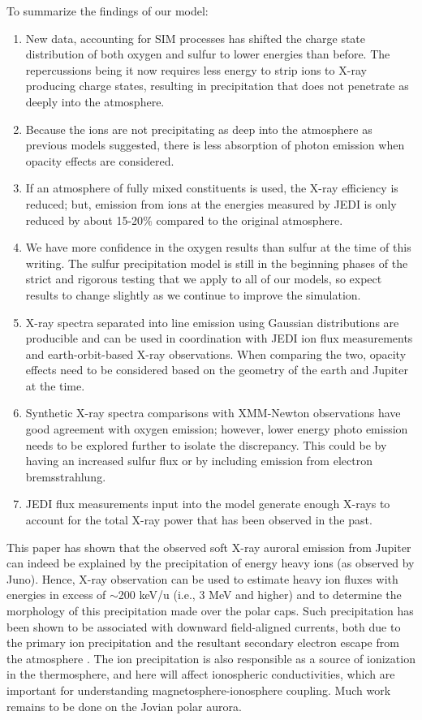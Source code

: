 \documentclass[draft]{agujournal2018}
\begin{document}
To summarize the findings of our model:
\begin{enumerate}
    \item New data, accounting for SIM processes has shifted the charge state distribution of both oxygen and sulfur to lower energies than before.
    The repercussions being it now requires less energy to strip ions to X-ray producing charge states, resulting in precipitation that does not penetrate as deeply into the atmosphere.
    \item Because the ions are not precipitating as deep into the atmosphere as previous models suggested, there is less absorption of photon emission when opacity effects are considered.
    \item If an atmosphere of fully mixed constituents is used, the X-ray efficiency is reduced; but, emission from ions at the energies measured by JEDI is only reduced by about 15-20$\%$ compared to the original atmosphere.
    \item We have more confidence in the oxygen results than sulfur at the time of this writing.
    The sulfur precipitation model is still in the beginning phases of the strict and rigorous testing that we apply to all of our models, so expect results to change slightly as we continue to improve the simulation.
    \item X-ray spectra separated into line emission using Gaussian distributions are producible and can be used in coordination with JEDI ion flux measurements and earth-orbit-based X-ray observations.
    When comparing the two, opacity effects need to be considered based on the geometry of the earth and Jupiter at the time.
    \item Synthetic X-ray spectra comparisons with XMM-Newton observations have good agreement with oxygen emission; however, lower energy photo emission needs to be explored further to isolate the discrepancy.
    This could be by having an increased sulfur flux or by including emission from electron bremsstrahlung.
    \item JEDI flux measurements input into the model generate enough X-rays to account for the total X-ray power that has been observed in the past.
\end{enumerate}

This paper has shown that the observed soft X-ray auroral emission from Jupiter can indeed be explained by the precipitation of energy heavy ions (as observed by Juno).
Hence, X-ray observation can be used to estimate heavy ion fluxes with energies in excess of $\sim$200 keV/u (i.e., 3 MeV and higher) and to determine the morphology of this precipitation made over the polar caps.
Such precipitation has been shown to be associated with downward field-aligned currents, both due to the primary ion precipitation and the resultant secondary electron escape from the atmosphere \citep{cravens2003,houston2018,ozak2010,ozak2013}.
The ion precipitation is also responsible as a source of ionization in the thermosphere, and here will affect ionospheric conductivities, which are important for understanding magnetosphere-ionosphere coupling.
Much work remains to be done on the Jovian polar aurora.
\end{document}
